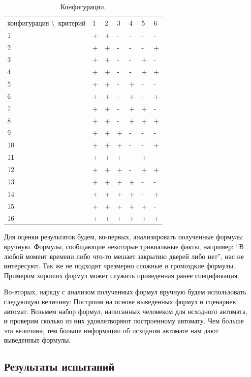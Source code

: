 \documentclass[12pt,fleqn]{article}
\begin{document}
\begin{table}
\centering
\begin{tabular}{ l | l | l | l | l | l | l }
конфигурация \textbackslash \ критерий & 1 & 2 & 3 & 4 & 5 & 6 \\
1  & + & + & - & - & - & - \\
2  & + & + & - & - & - & + \\
3  & + & + & - & - & + & - \\
4  & + & + & - & - & + & + \\
5  & + & + & - & + & - & - \\
6  & + & + & - & + & - & + \\
7  & + & + & - & + & + & - \\
8  & + & + & - & + & + & + \\
9  & + & + & + & - & - & - \\
10 & + & + & + & - & - & + \\
11 & + & + & + & - & + & - \\
12 & + & + & + & - & + & + \\
13 & + & + & + & + & - & - \\
14 & + & + & + & + & - & + \\
15 & + & + & + & + & + & - \\
16 & + & + & + & + & + & + \\
\end{tabular}
\caption{Конфигурации.}
\end{table}

Для оценки результатов будем, во-первых, анализировать полученные формулы вручную. Формулы, сообщающие некоторые тривиальные
факты, например: ``В любой момент времени либо что-то мешает закрытию дверей либо нет'', нас не интересуют.
Так же не подходят чрезмерно сложные и громоздкие формулы. Примером хороших формул может служить приведенная ранее спецификация.

Во-вторых, наряду с анализом полученных формул вручную будем использовать следующую величину:
Построим на основе выведенных формул и сценариев автомат. Возьмем набор формул, написанных человеком для исходного автомата, и
проверим сколько из них удовлетворяют построенному автомату. Чем больше эта величина, тем больше информации об исходном
автомате нам дают выведенные формулы.

\subsection{Результаты испытаний}
\end{document}
